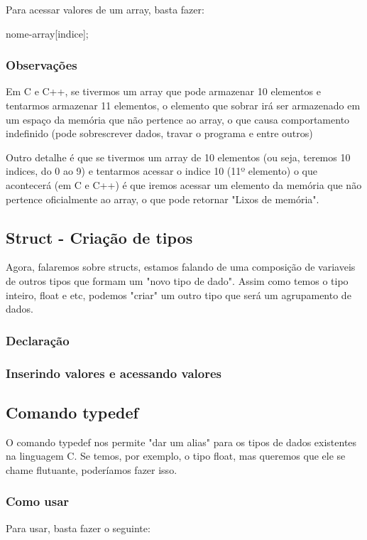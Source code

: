 \documentclass{report}
\begin{document}
	Para acessar valores de um array, basta fazer:
	
	
	\begin{LARGE}
		\begin{center}
			nome-array[indice];
		\end{center}
	\end{LARGE}
	
	
	\subsubsection{Observações}
	Em C e C++, se tivermos um array que pode armazenar 10 elementos e tentarmos armazenar 11 elementos, o elemento que sobrar irá ser armazenado em um espaço da memória que não pertence ao array, o que causa comportamento indefinido (pode sobrescrever dados, travar o programa e entre outros)
	
	Outro detalhe é que se tivermos um array de 10 elementos (ou seja, teremos 10 indices, do 0 ao 9) e tentarmos acessar o indice 10 (11º elemento) o que acontecerá (em C e C++) é que iremos acessar um elemento da memória que não pertence oficialmente ao array, o que pode retornar "Lixos de memória".
	
	
	\subsection{Struct - Criação de tipos}
	Agora, falaremos sobre structs, estamos falando de uma composição de variaveis de outros tipos que formam um "novo tipo de dado". Assim como temos o tipo inteiro, float e etc, podemos "criar" um outro tipo que será um agrupamento de dados.
	\subsubsection{Declaração}
	
	\subsubsection{Inserindo valores e acessando valores}
	
	\subsection{Comando typedef}
	O comando typedef nos permite "dar um alias" para os tipos de dados existentes na linguagem C. Se temos, por exemplo, o tipo float, mas queremos que ele se chame flutuante, poderíamos fazer isso. 
	\subsubsection{Como usar}
	Para usar, basta fazer o seguinte:
	
\end{document}
